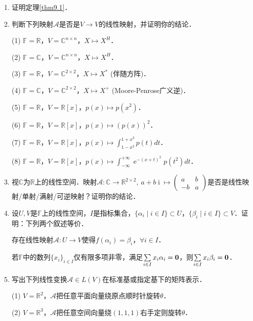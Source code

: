 \documentclass[a4paper,fontset=windows]{ctexbook}
\theoremstyle{definition}
\DeclareMathOperator{\E}{e}
\DeclareMathOperator{\I}{i}
\begin{document}
\begin{enumerate}
\item 证明定理\ref{thm9.1}．

\item 判断下列映射$\mathcal{A}$是否是$V\to V$的线性映射，并证明你的结论．

(1) $\mathbb{F}=\mathbb{R}$，$V=\mathbb{C}^{n\times n}$，$X\mapsto X^H$．

(2) $\mathbb{F}=\mathbb{C}$，$V=\mathbb{C}^{n\times n}$，$X\mapsto X^H$．

(3) $\mathbb{F}=\mathbb{R}$，$V=\mathbb{C}^{2\times 2}$，$X\mapsto X^*$ (伴随方阵)．

(4) $\mathbb{F}=\mathbb{C}$，$V=\mathbb{C}^{2\times 2}$，$X\mapsto X^+$ (Moore-Penrose广义逆)．

(5) $\mathbb{F}=\mathbb{R}$，$V=\mathbb{R}[x]$，$p(x)\mapsto p(x^2)$．

(6) $\mathbb{F}=\mathbb{R}$，$V=\mathbb{R}[x]$，$p(x)\mapsto (p(x))^2$．

(7) $\mathbb{F}=\mathbb{R}$，$V=\mathbb{R}[x]$，$p(x)\mapsto\int_{1-x^2}^{1+x^2}p(t)dt$．

(8) $\mathbb{F}=\mathbb{R}$，$V=\mathbb{R}[x]$，$p(x)\mapsto\int_{-\infty}^{+\infty}\E^{-(x+t)^2}p(t^2)dt$．

\item 视$\mathbb{C}$为$\mathbb{R}$上的线性空间．映射$\mathcal{A}:\mathbb{C}\to\mathbb{R}^{2\times 2},~a+b\I\mapsto\begin{pmatrix}a&b \\ -b&a\end{pmatrix}$是否是线性映射/单射/满射/可逆映射？证明你的结论．

\item 设$U,V$是$\mathbb{F}$上的线性空间，$I$是指标集合，$\{\alpha_i\mid i\in I\}\subset U$，$\{\beta_i\mid i\in I\}\subset V$．证明：下列两个叙述等价．

 存在线性映射$\mathcal{A}:U\to V$使得$f(\alpha_i)=\beta_i$，$\forall i\in I$．

 若$\mathbb{F}$中的数列$\{x_i\}_{i\in I}$仅有限多项非零，满足$\sum\limits_{i\in I}x_i\alpha_i={\bf 0}$，则$\sum\limits_{i\in I}x_i\beta_i={\bf 0}$．

\item 写出下列线性变换$\mathcal{A}\in L(V)$在标准基或指定基下的矩阵表示．

(1) $V=\mathbb{R}^2$，$\mathcal{A}$把任意平面向量绕原点顺时针旋转$\theta$．

(2) $V=\mathbb{R}^3$，$\mathcal{A}$把任意空间向量绕$(1,1,1)$右手定则旋转$\theta$．


\end{enumerate}
\end{document}
